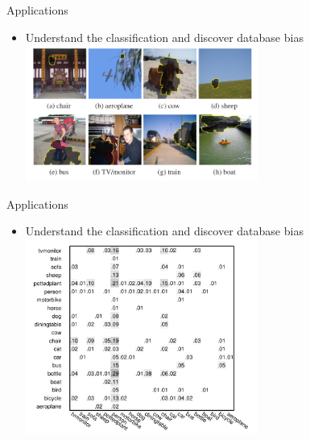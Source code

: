\documentclass[12pt]{beamer}
\begin{document}
\begin{frame}{Applications}
    \begin{itemize}
        \item Understand the classification and discover database bias
        \medskip
        { \includegraphics[width=0.6\textwidth]{fig3.png} } \\
    \end{itemize}
\end{frame}

\begin{frame}{Applications}
    \begin{itemize}
        \item Understand the classification and discover database bias
        \medskip
        { \includegraphics[width=0.6\textwidth]{fig5.png} } \\
    \end{itemize}
\end{frame}
\end{document}
